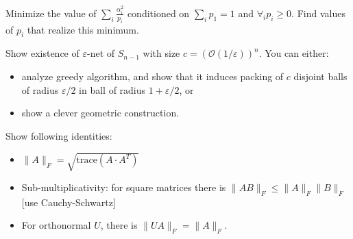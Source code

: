 \documentclass[12pt]{uebung}
\begin{document}
 

\newcommand{\bigo}{\mathcal{O}}
\renewcommand{\aufgname}{Exercise}


\begin{aufg}
Minimize the value of $\sum_{i} \frac{\alpha^2_i}{p_i}$ conditioned on $ \sum_i p_1 = 1$ and $\forall_i p_i\ge0$. Find values of $p_i$ that realize this minimum.
\end{aufg}

\begin{aufg}[2 pts]
Show existence of $\varepsilon$-net of $S_{n-1}$ with size $c = \left(\bigo(1/\varepsilon)\right)^{n}$. You can either:
\begin{itemize}
\item analyze greedy algorithm, and show that it induces packing of $c$ disjoint balls of radius $\varepsilon/2$ in ball of radius $1+\varepsilon/2$, or
\item show a clever geometric construction.
\end{itemize}
\end{aufg}

\begin{aufg}[1+2+1]
Show following identities:
\begin{itemize}
\item $\|A\|_F = \sqrt{\textrm{trace}(A \cdot A^T)}$
\item Sub-multiplicativity: for square matrices there is $\|A B\|_F \le \|A\|_F \|B\|_F$  [use Cauchy-Schwartz]
\item For orthonormal $U$, there is $\|UA\|_F = \|A\|_F$.
\end{itemize}
\end{aufg}
\end{document}
